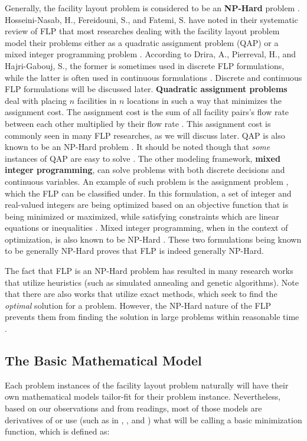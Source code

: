 Generally, the facility layout problem is considered to be an \textbf{NP-Hard} problem \cite{Drira2007}. Hosseini-Nasab, H., Fereidouni, S., and Fatemi, S. have noted in their systematic review of FLP that most researches dealing with the facility layout problem model their problems either as a quadratic assignment problem (QAP) or a mixed integer programming problem \cite{Hosseini-Nasab2018}. According to Drira, A., Pierreval, H., and Hajri-Gabouj, S., the former is sometimes used in discrete FLP formulations, while the latter is often used in continuous formulations \cite{Drira2007}. Discrete and continuous FLP formulations will be discussed later. \textbf{Quadratic assignment problems} deal with placing $n$ facilities in $n$ locations in such a way that minimizes the assignment cost. The assignment cost is the sum of all facility pairs's flow rate between each other multiplied by their flow rate \cite{QAPDefinition}. This assignment cost is commonly seen in many FLP researches, as we will discuss later. QAP is also known to be an NP-Hard problem \cite{Garey1979}. It should be noted though that \textit{some} instances of QAP are easy to solve \cite{Feizollahi2015}. The other modeling framework, \textbf{mixed integer programming}, can solve problems with both discrete decisions and continuous variables. An example of such problem is the assignment problem \cite{Richards2005}, which the FLP can be classified under. In this formulation, a set of integer and real-valued integers are being optimized based on an objective function that is being minimized or maximized, while satisfying constraints which are linear equations or inequalities \cite{Wolsey2008}. Mixed integer programming, when in the context of optimization, is also known to be NP-Hard \cite{Richards2005}. These two formulations being known to be generally NP-Hard proves that FLP is indeed generally NP-Hard.

The fact that FLP is an NP-Hard problem has resulted in many research works that utilize heuristics (such as simulated annealing and genetic algorithms). Note that there are also works that utilize exact methods, which seek to find the \textit{optimal} solution for a problem. However, the NP-Hard nature of the FLP prevents them from finding the solution in large problems within reasonable time \cite{Asl2015}.

\subsection{The Basic Mathematical Model}
Each problem instances of the facility layout problem naturally will have their own mathematical models tailor-fit for their problem instance. Nevertheless, based on our observations and from readings, most of those models are derivatives of or use (such as in \cite{Garcia-Hernandez2013}, \cite{Lin2019}, and \cite{Navarro2016}) what will be calling a basic minimization function, which is defined as:

